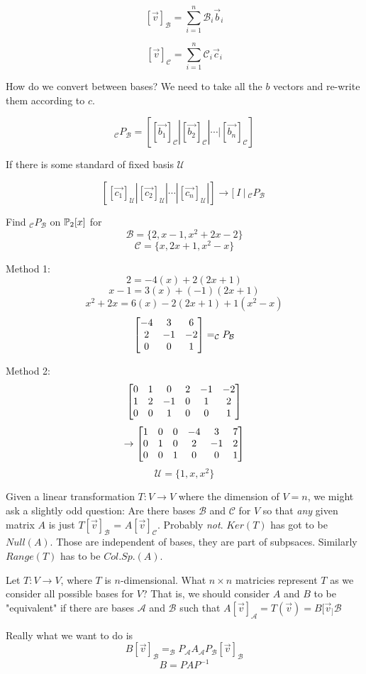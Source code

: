 \[ [\vec{v}]_\mathcal{B} = \sum_{i=1}^n \mathcal{B}_i\vec{b}_i\]

\[ [\vec{v}]_\mathcal{C} = \sum_{i=1}^n \mathcal{C}_i\vec{c}_i\]

How do we convert between bases? We need to take all the $b$ vectors and re-write them according to $c$.

\[ _\mathcal{C} P_\mathcal{B} = \left[ [\vec{b_1}]_\mathcal{C} | [\vec{b_2}]_\mathcal{C} | \cdots | [\vec{b_n}]_\mathcal{C} \right] \]

If there is some standard of fixed basis $\mathcal{U}$

\[ \left[ [\vec{c_1}]_\mathcal{U} | [\vec{c_2}]_\mathcal{U} | \cdots | [\vec{c_n}]_\mathcal{U} | \right] \to [\ I\ |\ _\mathcal{C} P_\mathcal{B}\ \]
\begin{example}
Find $_\mathcal{C} P_\mathcal{B}$ on $\mathbb{P}_2[x]$ for
\[ \mathcal{B} = \{ 2, x-1, x^2+2x-2 \} \]
\[ \mathcal{C} = \{ x, 2x+1, x^2-x \} \]

Method 1:
\[ 2 = -4(x)+2(2x+1) \]
\[ x -1 = 3(x) + (-1)(2x+1) \]
\[ x^2+2x =6(x) -2(2x+1) + 1(x^2-x) \]
\[ \begin{bmatrix}-4 & 3 & 6\\ 2 & -1 & -2\\ 0 & 0 & 1\end{bmatrix} = _\mathcal{C} P_\mathcal{B}\]

Method 2:
\[ \begin{bmatrix}0 & 1 & 0 & 2 & -1 & -2\\ 1 & 2 & -1 & 0 & 1 & 2\\ 0 & 0 & 1 & 0 & 0 & 1\end{bmatrix} \]
\[ \to \begin{bmatrix}1 & 0 & 0 & -4 & 3 & 7 \\ 0 & 1 & 0 & 2 & -1 & 2\\ 0 & 0 & 1 & 0 & 0 & 1\end{bmatrix} \]
\[ \mathcal{U}=\{ 1,x,x^2 \}\]
\end{example}

Given a linear transformation $T:V\to V$ where the dimension of $V=n$, we might ask a slightly odd question: Are there bases $\mathcal{B}$ and $\mathcal{C}$ for $V$ so that \emph{any} given matrix $A$ is just $T[\vec{v}]_\mathcal{B}$ = $A[\vec{v}]_\mathcal{C}$. Probably \emph{not}. $Ker(T)$ has got to be $Null(A)$. Those are independent of bases, they are part of subpsaces. Similarly $Range(T)$ has to be $Col.Sp.(A)$.

\begin{example}
Let $T:V\to V$, where $T$ is $n$-dimensional. What $n\times n$ matricies represent $T$ as we consider all possible bases for $V$? That is, we should consider $A$ and $B$ to be "equivalent" if there are bases $\mathcal{A}$ and $\mathcal{B}$ such that $A[\vec{v}]_\mathcal{A} = T(\vec{v}) = B[\vec{v}_]\mathcal{B}$

Really what we want to do is
\[ B[\vec{v}]_\mathcal{B} = _\mathcal{B}P_\mathcal{A} A_\mathcal{A}P_\mathcal{B}[\vec{v}]_\mathcal{B}\]
\[ B = P A P^{-1}\]
\end{example}


